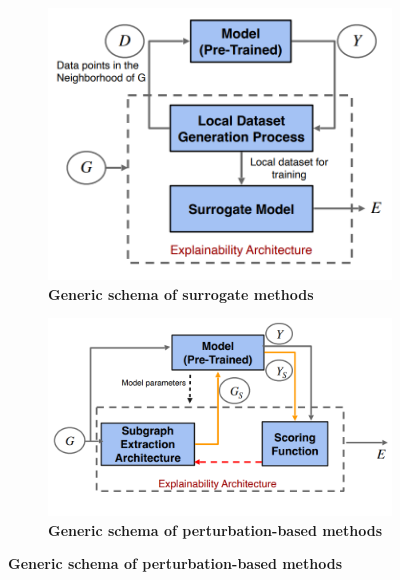 \begin{figure}[htbp]
\vspace{-2mm}
     \centering
     \begin{subfigure}[b]{0.43\textwidth}
         \centering
         \includegraphics[width=\textwidth]{submissions/Sourav2023/surrogate_method.png}
         \caption{\textbf{Generic schema of surrogate methods}}
         \label{fig:Surrogate_schema}
     \end{subfigure}
     \hfill
     \begin{subfigure}[b]{0.54\textwidth}
         \centering
         \includegraphics[width=\textwidth]{submissions/Sourav2023/perturbation_method.png}
         \caption{\textbf{Generic schema of perturbation-based methods}}
         \label{fig:Perturbation_schema}
     \end{subfigure}

\end{figure}
